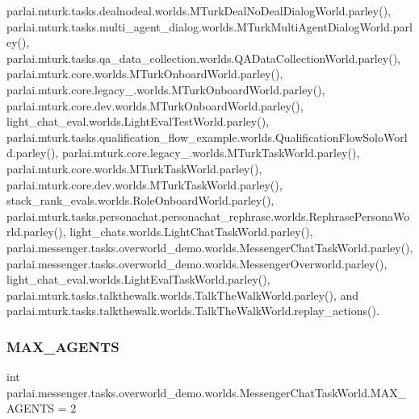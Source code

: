 parlai.\+mturk.\+tasks.\+dealnodeal.\+worlds.\+M\+Turk\+Deal\+No\+Deal\+Dialog\+World.\+parley(), parlai.\+mturk.\+tasks.\+multi\+\_\+agent\+\_\+dialog.\+worlds.\+M\+Turk\+Multi\+Agent\+Dialog\+World.\+parley(), parlai.\+mturk.\+tasks.\+qa\+\_\+data\+\_\+collection.\+worlds.\+Q\+A\+Data\+Collection\+World.\+parley(), parlai.\+mturk.\+core.\+worlds.\+M\+Turk\+Onboard\+World.\+parley(), parlai.\+mturk.\+core.\+legacy\+\_.\+worlds.\+M\+Turk\+Onboard\+World.\+parley(), parlai.\+mturk.\+core.\+dev.\+worlds.\+M\+Turk\+Onboard\+World.\+parley(), light\+\_\+chat\+\_\+eval.\+worlds.\+Light\+Eval\+Test\+World.\+parley(), parlai.\+mturk.\+tasks.\+qualification\+\_\+flow\+\_\+example.\+worlds.\+Qualification\+Flow\+Solo\+World.\+parley(), parlai.\+mturk.\+core.\+legacy\+\_.\+worlds.\+M\+Turk\+Task\+World.\+parley(), parlai.\+mturk.\+core.\+worlds.\+M\+Turk\+Task\+World.\+parley(), parlai.\+mturk.\+core.\+dev.\+worlds.\+M\+Turk\+Task\+World.\+parley(), stack\+\_\+rank\+\_\+evals.\+worlds.\+Role\+Onboard\+World.\+parley(), parlai.\+mturk.\+tasks.\+personachat.\+personachat\+\_\+rephrase.\+worlds.\+Rephrase\+Persona\+World.\+parley(), light\+\_\+chats.\+worlds.\+Light\+Chat\+Task\+World.\+parley(), parlai.\+messenger.\+tasks.\+overworld\+\_\+demo.\+worlds.\+Messenger\+Chat\+Task\+World.\+parley(), parlai.\+messenger.\+tasks.\+overworld\+\_\+demo.\+worlds.\+Messenger\+Overworld.\+parley(), light\+\_\+chat\+\_\+eval.\+worlds.\+Light\+Eval\+Task\+World.\+parley(), parlai.\+mturk.\+tasks.\+talkthewalk.\+worlds.\+Talk\+The\+Walk\+World.\+parley(), and parlai.\+mturk.\+tasks.\+talkthewalk.\+worlds.\+Talk\+The\+Walk\+World.\+replay\+\_\+actions().

\mbox{\label{classparlai_1_1messenger_1_1tasks_1_1overworld__demo_1_1worlds_1_1MessengerChatTaskWorld_a1b4eb29fc582c6a0a6b7f82143791ce7}} 
\subsubsection{\texorpdfstring{M\+A\+X\+\_\+\+A\+G\+E\+N\+TS}{MAX\_AGENTS}}
{\footnotesize\ttfamily int parlai.\+messenger.\+tasks.\+overworld\+\_\+demo.\+worlds.\+Messenger\+Chat\+Task\+World.\+M\+A\+X\+\_\+\+A\+G\+E\+N\+TS = 2\hspace{0.3cm}{\ttfamily [static]}}



